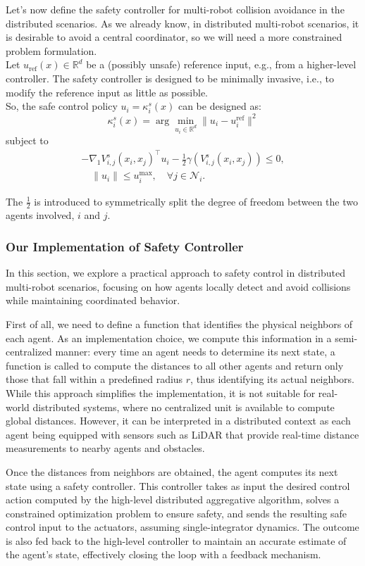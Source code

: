\medskip
Let's now define the safety controller for multi-robot collision avoidance in the distributed scenarios.
As we already know, in distributed multi-robot scenarios, it is desirable to avoid a central coordinator, so we will need a more constrained problem formulation. \\
Let $u_{\mathrm{ref}}(x) \in \mathbb{R}^d$ be a (possibly unsafe) reference input, e.g., from a higher-level controller.  
The safety controller is designed to be minimally invasive, i.e., to modify the reference input as little as possible. \\
So, the safe control policy $u_i = \kappa_i^s(x)$ can be designed as:
\[
\kappa^s_i(x) = \arg\min_{u_i \in \mathbb{R}^d} \|u_i - u_i^{\mathrm{ref}}\|^2
\]
subject to
\begin{align*}
    -\nabla_1 V^s_{i,j}(x_i, x_j)^\top u_i - \tfrac{1}{2} \gamma (V^s_{i,j}(x_i, x_j)) \leq 0,  \\ 
    \quad \|u_i\| \leq u_i^{\max}, \quad \forall j \in \mathcal{N}_i. 
\end{align*}

The $\frac{1}{2}$ is introduced to symmetrically split the degree of freedom between the two agents involved, $i$ and $j$.

\subsubsection{Our Implementation of Safety Controller}
In this section, we explore a practical approach to safety control in distributed multi-robot scenarios, focusing on how agents locally detect and avoid collisions while maintaining coordinated behavior.

\medskip
First of all, we need to define a function that identifies the physical neighbors of each agent. As an implementation choice, we compute this information in a semi-centralized manner: every time an agent needs to determine its next state, a function is called to compute the distances to all other agents and return only those that fall within a predefined radius \( r \), thus identifying its actual neighbors. While this approach simplifies the implementation, it is not suitable for real-world distributed systems, where no centralized unit is available to compute global distances. However, it can be interpreted in a distributed context as each agent being equipped with sensors such as LiDAR that provide real-time distance measurements to nearby agents and obstacles.

\medskip
Once the distances from neighbors are obtained, the agent computes its next state using a safety controller. This controller takes as input the desired control action computed by the high-level distributed aggregative algorithm, solves a constrained optimization problem to ensure safety, and sends the resulting safe control input to the actuators, assuming single-integrator dynamics. The outcome is also fed back to the high-level controller to maintain an accurate estimate of the agent's state, effectively closing the loop with a feedback mechanism.

